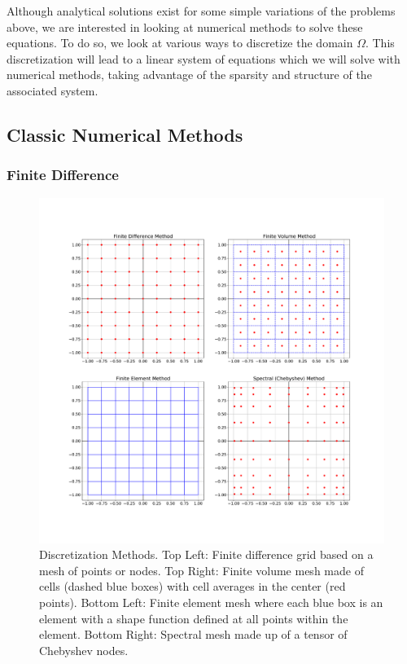 Although analytical solutions exist for some simple variations of the problems above, we are interested in looking at numerical methods to solve these equations. To do so, we look at various ways to discretize the domain $\Omega$. This discretization will lead to a linear system of equations which we will solve with numerical methods, taking advantage of the sparsity and structure of the associated system.

\subsection{Classic Numerical Methods}
\label{sec:numerical-methods-for-elliptic-pdes}

\subsubsection{Finite Difference}
\label{subsub:finite-difference}

\begin{figure}
    \centering
    \includegraphics[width=0.8\columnwidth]{figures/PDE_discretization_methods.pdf}
    \caption{Discretization Methods. Top Left: Finite difference grid based on a mesh of points or nodes. Top Right: Finite volume mesh made of cells (dashed blue boxes) with cell averages in the center (red points). Bottom Left: Finite element mesh where each blue box is an element with a shape function defined at all points within the element. Bottom Right: Spectral mesh made up of a tensor of Chebyshev nodes.}
    \label{fig:discretization_methods}
\end{figure}

